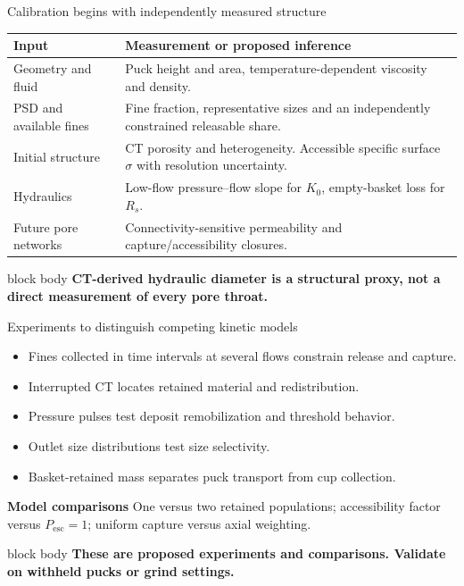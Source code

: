 \documentclass[aspectratio=169,11pt]{beamer}
\newcommand{\hi}[1]{\textcolor{tumblue}{\textbf{#1}}}
\newcommand{\takeaway}[1]{%
  \begin{beamercolorbox}[rounded=true,sep=.55em]{block body}
    \centering\color{tumdark}\textbf{#1}
  \end{beamercolorbox}}
\begin{document}
\begin{frame}{Calibration begins with independently measured structure}
\small

\begin{tabular}{p{3cm}p{8.3cm}}
\toprule
Input & Measurement or proposed inference\\\midrule
Geometry and fluid & Puck height and area, temperature-dependent viscosity and density.\\[.6em]
PSD and available fines & Fine fraction, representative sizes and an independently constrained releasable share.\\[.6em]
Initial structure & CT porosity and heterogeneity. Accessible specific surface $\sigma$ with resolution uncertainty.\\[.6em]
Hydraulics & Low-flow pressure--flow slope for $K_0$, empty-basket loss for $R_s$.\\[.6em]
Future pore networks & Connectivity-sensitive permeability and capture/accessibility closures.\\\bottomrule
\end{tabular}
\vfill
\takeaway{CT-derived hydraulic diameter is a structural proxy, not a direct measurement of every pore throat.}

\end{frame}

\begin{frame}{Experiments to distinguish competing kinetic models}
\small

\begin{itemize}
\item Fines collected in time intervals at several flows constrain release and capture.
\item Interrupted CT locates retained material and redistribution.
\item Pressure pulses test deposit remobilization and threshold behavior.
\item Outlet size distributions test size selectivity.
\item Basket-retained mass separates puck transport from cup collection.
\end{itemize}
\medskip
\hi{Model comparisons}
\small One versus two retained populations; accessibility factor versus $P_{\mathrm{esc}}=1$; uniform capture versus axial weighting.
\vfill
\takeaway{These are proposed experiments and comparisons. Validate on withheld pucks or grind settings.}

\end{frame}
\end{document}
